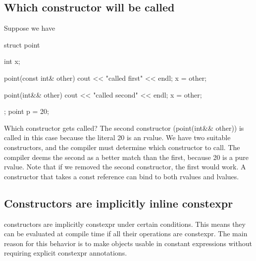 \documentclass{report}
\begin{document}
    \subsection{Which constructor will be called}
    \bigbreak \noindent 
    Suppose we have
    \bigbreak \noindent 
    \begin{cppcode}
        struct  point {
            int x{};

            point(const int& other) {
                cout << "called first" << endl;
                x = other;
            }

            point(int&& other) {
                cout << "called second" << endl;
                x = other;
            }
        };
        point p = 20;
    \end{cppcode}
    \bigbreak \noindent 
    Which constructor gets called? The second constructor (point(int\&\& other)) is called in this case because the literal 20 is an rvalue.
    \bigbreak \noindent 
    We have two suitable constructors, and the compiler must determine which constructor to call.
    \bigbreak \noindent 
    The compiler  deems the second as a better match than the first, because 20 is a pure rvalue. Note that if we removed the second constructor, the first would work. A constructor that takes a const reference can bind to both rvalues and lvalues.

    \bigbreak \noindent 
    \subsection{Constructors are implicitly inline constexpr}
    \bigbreak \noindent 
    constructors are implicitly constexpr under certain conditions. This means they can be evaluated at compile time if all their operations are constexpr. The main reason for this behavior is to make objects usable in constant expressions without requiring explicit constexpr annotations.

    \bigbreak \noindent 
\end{document}
